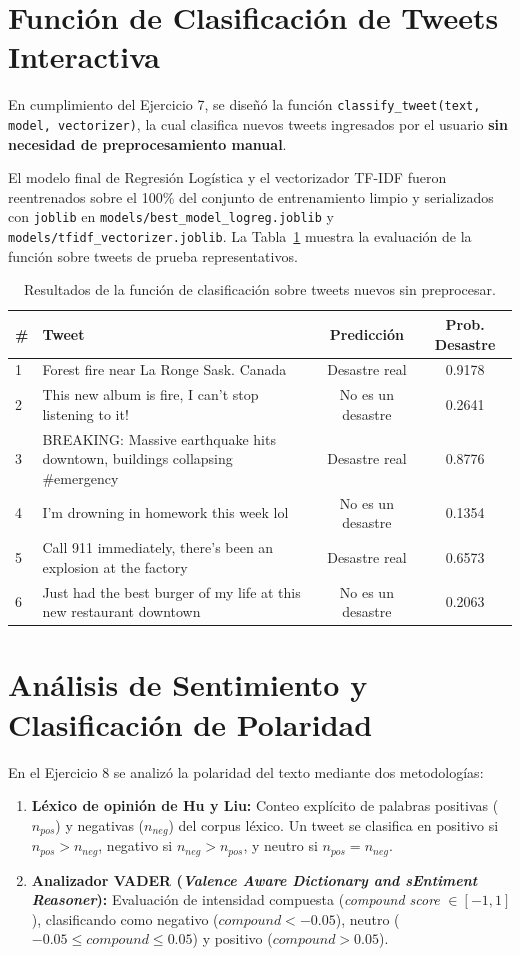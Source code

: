 \documentclass[11pt,a4paper]{article}
\begin{document}
\section{Función de Clasificación de Tweets Interactiva}
En cumplimiento del Ejercicio 7, se diseñó la función \texttt{classify\_tweet(text, model, vectorizer)}, la cual clasifica nuevos tweets ingresados por el usuario \textbf{sin necesidad de preprocesamiento manual}.

El modelo final de Regresión Logística y el vectorizador TF-IDF fueron reentrenados sobre el 100\% del conjunto de entrenamiento limpio y serializados con \texttt{joblib} en \texttt{models/best\_model\_logreg.joblib} y \texttt{models/tfidf\_vectorizer.joblib}. La Tabla~\ref{tab:classify_examples} muestra la evaluación de la función sobre tweets de prueba representativos.

\begin{table}[H]
\centering
\small
\caption{Resultados de la función de clasificación sobre tweets nuevos sin preprocesar.}
\label{tab:classify_examples}
\begin{tabular}{lp{7.5cm}cc}
\toprule
\textbf{\#} & \textbf{Tweet} & \textbf{Predicción} & \textbf{Prob. Desastre} \\
\midrule
1 & Forest fire near La Ronge Sask. Canada & Desastre real & 0.9178 \\
2 & This new album is fire, I can't stop listening to it! & No es un desastre & 0.2641 \\
3 & BREAKING: Massive earthquake hits downtown, buildings collapsing \#emergency & Desastre real & 0.8776 \\
4 & I'm drowning in homework this week lol & No es un desastre & 0.1354 \\
5 & Call 911 immediately, there's been an explosion at the factory & Desastre real & 0.6573 \\
6 & Just had the best burger of my life at this new restaurant downtown & No es un desastre & 0.2063 \\
\bottomrule
\end{tabular}
\end{table}

\section{Análisis de Sentimiento y Clasificación de Polaridad}
En el Ejercicio 8 se analizó la polaridad del texto mediante dos metodologías:
\begin{enumerate}
    \item \textbf{Léxico de opinión de Hu y Liu:} Conteo explícito de palabras positivas ($n_{pos}$) y negativas ($n_{neg}$) del corpus léxico. Un tweet se clasifica en positivo si $n_{pos} > n_{neg}$, negativo si $n_{neg} > n_{pos}$, y neutro si $n_{pos} = n_{neg}$.
    \item \textbf{Analizador VADER (\textit{Valence Aware Dictionary and sEntiment Reasoner}):} Evaluación de intensidad compuesta (\textit{compound score} $\in [-1, 1]$), clasificando como negativo ($compound < -0.05$), neutro ($-0.05 \le compound \le 0.05$) y positivo ($compound > 0.05$).
\end{enumerate}
\end{document}
